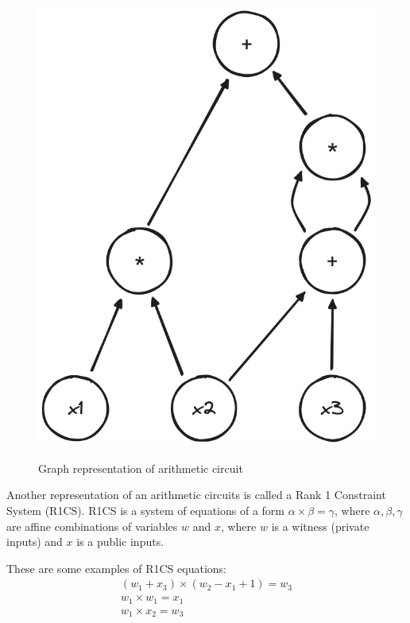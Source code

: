 \begin{figure}[h]
    \centering
    \includegraphics[scale=0.25]{assets/images/dag_example.png}
    \caption{Graph representation of arithmetic circuit}
    \label{fig:dag_example}
	\cite{youtuMOOCLecture3}
    \vspace{0.5cm}
\end{figure}

Another representation of an arithmetic circuits is called a Rank 1 Constraint
System (R1CS). R1CS is a system of equations of a form $\alpha \times \beta = \gamma$,
where $\alpha, \beta, \gamma$ are affine combinations of variables $w$ and $x$,
where $w$ is a witness (private inputs) and $x$ is a public inputs.

These are some examples of R1CS equations:
\begin{displaymath}
    \begin{array}{l}
        (w_1 + x_3) \times (w_2 - x_1 + 1) = w_3 \\
        w_1 \times w_1 = x_1                     \\
        w_1 \times x_2 = w_3
    \end{array}
\end{displaymath}

